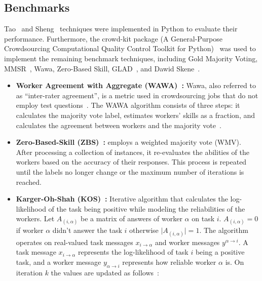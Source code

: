 \subsection{Benchmarks}
Tao~\cite{tao_Label_2020} and Sheng~\cite{sheng_Majority_2019} techniques were implemented in Python to evaluate their performance. Furthermore, the crowd-kit package (A General-Purpose Crowdsourcing Computational Quality Control Toolkit for Python)~\cite{ustalov_learning_2021} was used to implement the remaining benchmark techniques, including Gold Majority Voting, MMSR~\cite{ma_Adversarial_2020}, Wawa, Zero-Based Skill, GLAD~\cite{whitehill_Whose_2009}, and Dawid Skene~\cite{dawid_Maximum_1979}.
%
\begin{itemize}
    \item \textbf{Worker Agreement with Aggregate (WAWA)~\cite{crowdkit_webpage_documentation}:} Wawa, also referred to as ``inter-rater agreement'', is a metric used in crowdsourcing jobs that do not employ test questions~\cite{appen_wawa_2023}. The WAWA algorithm consists of three steps: it calculates the majority vote label, estimates workers' skills as a fraction, and calculates the agreement between workers and the majority vote~\cite{crowdkit_webpage_documentation}.
    \item \textbf{Zero-Based-Skill (ZBS)~\cite{crowdkit_webpage_documentation}:} employs a weighted majority vote (WMV). After processing a collection of instances, it re-evaluates the abilities of the workers based on the accuracy of their responses. This process is repeated until the labels no longer change or the maximum number of iterations is reached.
    \item \textbf{Karger-Oh-Shah (KOS)~\cite{crowdkit_webpage_documentation}:} Iterative algorithm that calculates the log-likelihood of the task being positive while modeling the reliabilities of the workers. Let $A_{(i,\alpha)} $ be a matrix of answers of worker $\alpha $ on task $i $. $A_{(i,\alpha)} = 0 $ if worker $\alpha $ didn't answer the task $i $ otherwise $\vert A_{(i,\alpha)} \vert = 1 $. The algorithm operates on real-valued task messages $x_{i \rightarrow \alpha} $  and worker messages $y^{\alpha \rightarrow i} $. A task message $x_{i \rightarrow \alpha} $ represents the log-likelihood of task $i $ being a positive task, and a worker message $y_{\alpha \rightarrow i} $ represents how reliable worker $\alpha $ is. On iteration $k$ the values are updated as follows~\cite{crowdkit_webpage_documentation}:
    \begin{equation}

\end{equation}
\end{itemize}
